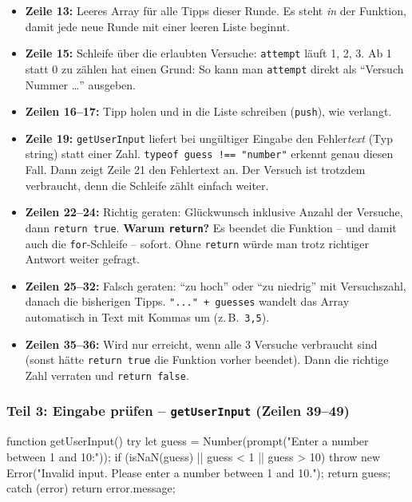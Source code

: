\documentclass[a4paper,11pt]{article}
\begin{document}
\begin{itemize}
\item \textbf{Zeile 13:} Leeres Array für alle Tipps dieser Runde. Es steht \emph{in} der Funktion, damit jede neue
      Runde mit einer leeren Liste beginnt.
\item \textbf{Zeile 15:} Schleife über die erlaubten Versuche: \texttt{attempt} läuft 1, 2, 3. Ab 1 statt 0 zu zählen
      hat einen Grund: So kann man \texttt{attempt} direkt als "`Versuch Nummer \dots"' ausgeben.
\item \textbf{Zeilen 16--17:} Tipp holen und in die Liste schreiben (\texttt{push}), wie verlangt.
\item \textbf{Zeile 19:} \texttt{getUserInput} liefert bei ungültiger Eingabe den Fehler\emph{text} (Typ string)
      statt einer Zahl. \lstinline|typeof guess !== "number"| erkennt genau diesen Fall. Dann zeigt Zeile 21 den
      Fehlertext an. Der Versuch ist trotzdem verbraucht, denn die Schleife zählt einfach weiter.
\item \textbf{Zeilen 22--24:} Richtig geraten: Glückwunsch inklusive Anzahl der Versuche, dann \lstinline|return true|.
      \textbf{Warum \texttt{return}?} Es beendet die Funktion -- und damit auch die \texttt{for}-Schleife -- sofort.
      Ohne \texttt{return} würde man trotz richtiger Antwort weiter gefragt.
\item \textbf{Zeilen 25--32:} Falsch geraten: "`zu hoch"' oder "`zu niedrig"' mit Versuchszahl, danach die bisherigen
      Tipps. \lstinline|"..." + guesses| wandelt das Array automatisch in Text mit Kommas um (z.\,B.\ \texttt{3,5}).
\item \textbf{Zeilen 35--36:} Wird nur erreicht, wenn alle 3 Versuche verbraucht sind (sonst hätte
      \lstinline|return true| die Funktion vorher beendet). Dann die richtige Zahl verraten und \lstinline|return false|.
\end{itemize}

\subsubsection*{Teil 3: Eingabe prüfen -- \texttt{getUserInput} (Zeilen 39--49)}
\begin{code}[firstnumber=39]
function getUserInput() {
    try {
        let guess = Number(prompt("Enter a number between 1 and 10:"));
        if (isNaN(guess) || guess < 1 || guess > 10) {
            throw new Error("Invalid input. Please enter a number between 1 and 10.");
        }
        return guess;
    } catch (error) {
        return error.message;
    }
}
\end{code}
\end{document}
